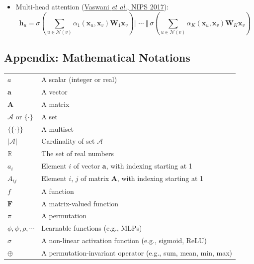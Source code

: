 \documentclass{article}
\begin{document}
\begin{enumerate}
\begin{itemize}[topsep=0pt]
		\item Multi-head attention (\href{https://papers.nips.cc/paper/2017/file/3f5ee243547dee91fbd053c1c4a845aa-Paper.pdf}{Vaswani \textit{et al.}, NIPS 2017}):
		$$\mathbf{h}_u=\sigma\left(\sum_{u\in\mathcal{N}(v)}\alpha_1(\mathbf{x}_u,\mathbf{x}_v)\mathbf{W}_1\mathbf{x}_v\right)\Bigg\Vert\ \cdots\ \Bigg\Vert\ \sigma\left(\sum_{u\in\mathcal{N}(v)}\alpha_K(\mathbf{x}_u,\mathbf{x}_v)\mathbf{W}_K\mathbf{x}_v\right)$$
	\end{itemize}
	
\end{enumerate}

\newpage

\subsection*{Appendix: Mathematical Notations}

\renewcommand\arraystretch{1.5}
\begin{tabular}{p{2cm}p{12cm}}
	$\displaystyle a$ & A scalar (integer or real) \\
	$\displaystyle \mathbf{a}$ & A vector \\
	$\displaystyle \mathbf{A}$ & A matrix \\
	$\displaystyle \mathcal{A}\text{ or }\{\cdot\}$ & A set \\
	$\displaystyle \{\!\{\cdot\}\!\}$ & A multiset \\
	$\displaystyle |\mathcal{A}|$ & Cardinality of set $\mathcal{A}$ \\
	$\displaystyle \mathbb{R}$ & The set of real numbers \\
	$\displaystyle a_i$ & Element $i$ of vector $\mathbf{a}$, with indexing starting at 1 \\
	$\displaystyle A_{ij}$ & Element $i$, $j$ of matrix $\mathbf{A}$, with indexing starting at 1 \\
	$\displaystyle f$ & A function \\
	$\displaystyle \bm{F}$ & A matrix-valued function \\
	$\displaystyle \pi$ & A permutation \\
	$\displaystyle \phi, \psi, \rho, \cdots$ & Learnable functions (e.g., MLPs) \\
	$\displaystyle \sigma$ & A non-linear activation function (e.g., sigmoid, ReLU) \\
	$\displaystyle \oplus$ & A permutation-invariant operator (e.g., sum, mean, min, max)
\end{tabular}
\end{document}
